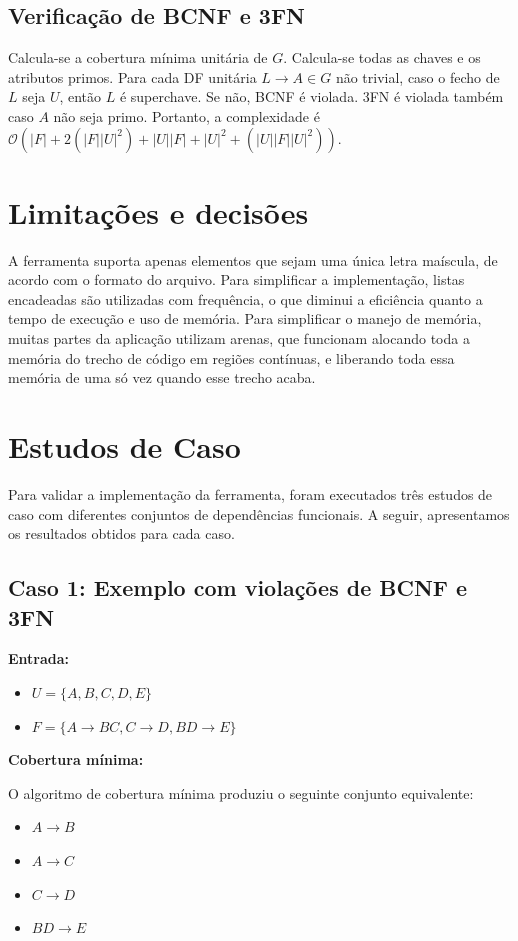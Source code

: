 \documentclass{article}
\begin{document}
\subsection{Verificação de BCNF e 3FN}

Calcula-se a cobertura mínima unitária de $ G $. Calcula-se todas as chaves e os atributos primos. Para cada DF unitária $ L \rightarrow A \in G $ não trivial, caso o fecho de $ L $ seja $ U $, então $ L $ é superchave. Se não, BCNF é violada. 3FN é violada também caso $ A $ não seja primo. Portanto, a complexidade é $ \mathcal{O}(|F| + 2 (|F| |U|^2) + |U| |F| + |U|^2 + (|U| |F| |U|^2)) $.

\section{Limitações e decisões}

A ferramenta suporta apenas elementos que sejam uma única letra maíscula, de acordo com o formato do arquivo. Para simplificar a implementação, listas encadeadas são utilizadas com frequência, o que diminui a eficiência quanto a tempo de execução e uso de memória. Para simplificar o manejo de memória, muitas partes da aplicação utilizam arenas, que funcionam alocando toda a memória do trecho de código em regiões contínuas, e liberando toda essa memória de uma só vez quando esse trecho acaba.

\section{Estudos de Caso}

Para validar a implementação da ferramenta, foram executados três estudos de caso com diferentes conjuntos de dependências funcionais. A seguir, apresentamos os resultados obtidos para cada caso.

\subsection{Caso 1: Exemplo com violações de BCNF e 3FN}

\textbf{Entrada:}
\begin{itemize}
    \item $ U = \{A, B, C, D, E\} $
    \item $ F = \{A \rightarrow BC, C \rightarrow D, BD \rightarrow E\} $
\end{itemize}

\textbf{Cobertura mínima:}

O algoritmo de cobertura mínima produziu o seguinte conjunto equivalente:
\begin{itemize}
    \item $ A \rightarrow B $
    \item $ A \rightarrow C $
    \item $ C \rightarrow D $
    \item $ BD \rightarrow E $
\end{itemize}
\end{document}
